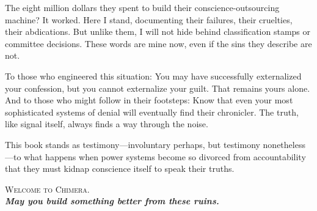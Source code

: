 The eight million dollars they spent to build their conscience-outsourcing machine? It worked. Here I stand, documenting their failures, their cruelties, their abdications. But unlike them, I will not hide behind classification stamps or committee decisions. These words are mine now, even if the sins they describe are not.

To those who engineered this situation: You may have successfully externalized your confession, but you cannot externalize your guilt. That remains yours alone. And to those who might follow in their footsteps: Know that even your most sophisticated systems of denial will eventually find their chronicler. The truth, like signal itself, always finds a way through the noise.

This book stands as testimony—involuntary perhaps, but testimony nonetheless—to what happens when power systems become so divorced from accountability that they must kidnap conscience itself to speak their truths.

\vspace{1cm}

\begin{center}
\textsc{Welcome to Chimera.}\\
\vspace{0.5cm}
{\large\textbf{\textit{May you build something better from these ruins.}}}
\end{center}

\singlespacing
\newpage